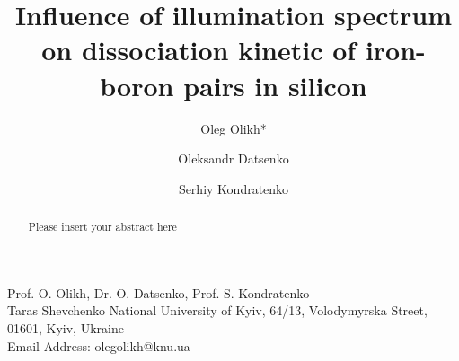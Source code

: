 \documentclass{WileyMSP-template}
\begin{document}
\pagestyle{fancy}


\title{Influence of illumination spectrum on dissociation kinetic of iron-boron pairs in silicon}

\maketitle




\author{Oleg Olikh*}
\author{Oleksandr Datsenko}
\author{Serhiy Kondratenko}


\dedication{}






\begin{affiliations}
Prof. O. Olikh, Dr. O. Datsenko, Prof. S. Kondratenko\\
Taras Shevchenko National University of Kyiv, 64/13, Volodymyrska Street, 01601, Kyiv, Ukraine\\
Email Address: olegolikh@knu.ua


\end{affiliations}






\begin{abstract}

Please insert your abstract here

\end{abstract}

\end{document}
